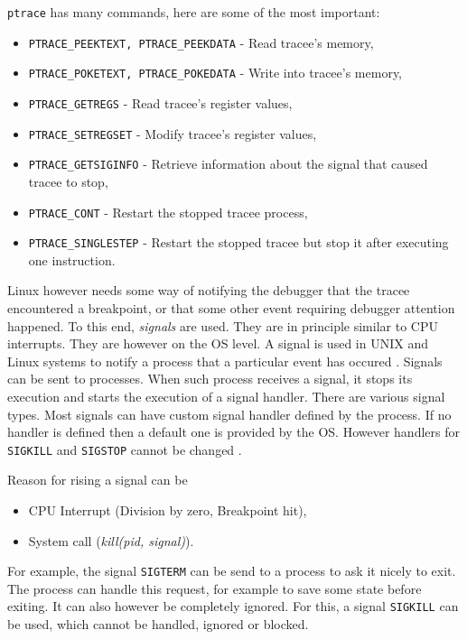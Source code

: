 \texttt{ptrace} has many commands, here are some of the most important:
\begin{itemize}
    \item \texttt{PTRACE\_PEEKTEXT, PTRACE\_PEEKDATA} - Read tracee's memory,
    \item \texttt{PTRACE\_POKETEXT, PTRACE\_POKEDATA} - Write into tracee's memory,
    \item \texttt{PTRACE\_GETREGS} - Read tracee's register values,
    \item \texttt{PTRACE\_SETREGSET} - Modify tracee's register values,
    \item \texttt{PTRACE\_GETSIGINFO} - Retrieve information about the signal that caused tracee to stop,
    \item \texttt{PTRACE\_CONT} - Restart the stopped tracee process,
    \item \texttt{PTRACE\_SINGLESTEP} - Restart the stopped tracee but
          stop it after executing one instruction.
\end{itemize}

Linux however needs some way of notifying the debugger that the tracee
encountered a breakpoint, or that some other event requiring debugger attention
happened. To this end, \textit{signals} are used. They are in principle similar
to CPU interrupts. They are however on the OS level. A signal is used in UNIX
and Linux systems to notify a process that a particular event has occured
\cite{os-concepts}. Signals can be sent to processes. When such process
receives a signal, it stops its execution and starts the execution of a signal
handler. There are various signal types. Most signals can have custom signal
handler defined by the process. If no handler is defined then a default one is
provided by the OS. However handlers for \texttt{SIGKILL} and \texttt{SIGSTOP}
cannot be changed \cite{signals}.

Reason for rising a signal can be 
\begin{itemize}
    \item CPU Interrupt (Division by zero, Breakpoint hit),
    \item System call (\textit{kill(pid, signal)}).
\end{itemize}

For example, the signal \texttt{SIGTERM} can be send to a process to ask it
nicely to exit. The process can handle this request, for example to save some
state before exiting. It can also however be completely ignored. For this, a
signal \texttt{SIGKILL} can be used, which cannot be handled, ignored or
blocked.

